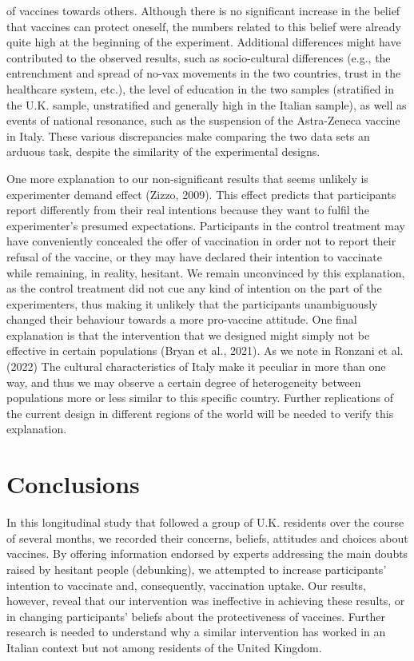 \documentclass[authordate, empirical]{jote-new-article}
\begin{document}
of vaccines towards others. Although there is no significant increase in the belief that vaccines can protect oneself, the numbers related to this belief were already quite high at the beginning of the experiment. Additional differences might have contributed to the observed results, such as socio-cultural differences (e.g., the entrenchment and spread of no-vax movements in the two countries, trust in the healthcare system, etc.), the level of education in the two samples (stratified in the U.K. sample, unstratified and generally high in the Italian sample), as well as events of national resonance, such as the suspension of the Astra-Zeneca vaccine in Italy. These various discrepancies make comparing the two data sets an arduous task, despite the similarity of the experimental designs.



One more explanation to our non-significant results that seems unlikely is experimenter demand effect (Zizzo, 2009). This effect predicts that participants report differently from their real intentions because they want to fulfil the experimenter's presumed expectations. Participants in the control treatment may have conveniently concealed the offer of vaccination in order not to report their refusal of the vaccine, or they may have declared their intention to vaccinate while remaining, in reality, hesitant. We remain unconvinced by this explanation, as the control treatment did not cue any kind of intention on the part of the experimenters, thus making it unlikely that the participants unambiguously changed their behaviour towards a more pro-vaccine attitude. One final explanation is that the intervention that we designed might simply not be effective in certain populations (Bryan et al., 2021). As we note in Ronzani et al. (2022) The cultural characteristics of Italy make it peculiar in more than one way, and thus we may observe a certain degree of heterogeneity between populations more or less similar to this specific country. Further replications of the current design in different regions of the world will be needed to verify this explanation.




\section{Conclusions}



In this longitudinal study that followed a group of U.K. residents over the course of several months, we recorded their concerns, beliefs, attitudes and choices about vaccines. By offering information endorsed by experts addressing the main doubts raised by hesitant people (debunking), we attempted to increase participants' intention to vaccinate and, consequently, vaccination uptake. Our results, however, reveal that our intervention was ineffective in achieving these results, or in changing participants' beliefs about the protectiveness of vaccines. Further research is needed to understand why a similar intervention has worked in an Italian context but not among residents of the United Kingdom.
\end{document}
